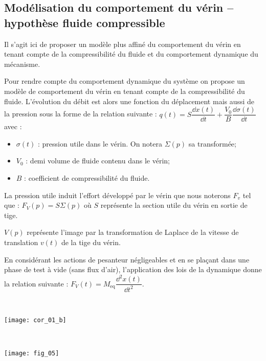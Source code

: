 \subsection*{Modélisation du comportement du vérin -- hypothèse fluide compressible}
\ifprof
\else

\begin{obj}
Il s'agit ici de proposer un modèle plus affiné du comportement du vérin en tenant compte de la compressibilité du fluide et du comportement dynamique du mécanisme.
\end{obj}		



Pour rendre compte du comportement dynamique du système on propose un modèle de comportement du vérin en tenant compte de la compressibilité du fluide. L'évolution du débit est alors une fonction du déplacement mais aussi de la pression sous la forme de la relation suivante : $q(t)=S\dfrac{\dd x(t)}{\dd t}+\dfrac{V_0}{B}\dfrac{\dd \sigma(t)}{\dd t}$ avec : 
\begin{itemize}
\item $\sigma(t)$ : pression utile dans le vérin. On notera $\Sigma(p)$ sa transformée;
\item $V_0$ : demi volume de fluide contenu dans le vérin;
\item $B$ : coefficient de compressibilité du fluide.
\end{itemize}  

La pression utile induit l'effort développé par le vérin que nous noterons $F_v$ tel que : $F_V(p)=S\Sigma(p)$ où $S$ représente la section utile du vérin en sortie de tige.

$V(p)$ représente l'image par la transformation de Laplace de la vitesse de translation $v(t)$ de la tige du vérin. 

En considérant les actions de pesanteur négligeables et en se plaçant dans une phase de test à vide (sans flux d'air), l'application des lois de la dynamique donne la relation suivante : $F_V(t)=M_{\text{eq}} \dfrac{\dd^2 x(t)}{\dd t^2}$.

\fi 

\ifprof
\begin{corrige} ~\\
\begin{center}
\texttt{[image: cor\_01\_b]}
\end{center}

\end{corrige}
\else
\
\begin{center}
\texttt{[image: fig\_05]}
\end{center}

